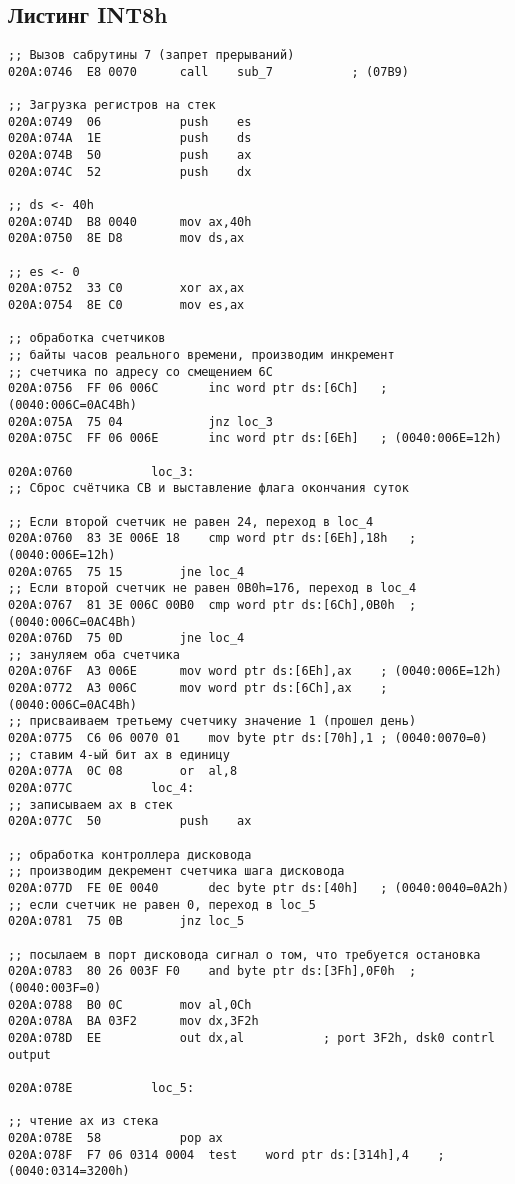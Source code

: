 \subsection*{Листинг INT8h} 
\begin{lstlisting}[style={asm}]
;; Вызов сабрутины 7 (запрет прерываний)
020A:0746  E8 0070		call	sub_7			; (07B9)

;; Загрузка регистров на стек
020A:0749  06			push	es
020A:074A  1E			push	ds
020A:074B  50			push	ax
020A:074C  52			push	dx

;; ds <- 40h
020A:074D  B8 0040		mov	ax,40h
020A:0750  8E D8		mov	ds,ax

;; es <- 0
020A:0752  33 C0		xor	ax,ax		
020A:0754  8E C0		mov	es,ax

;; обработка счетчиков
;; байты часов реального времени, производим инкремент 
;; счетчика по адресу со смещением 6C
020A:0756  FF 06 006C		inc	word ptr ds:[6Ch]	; (0040:006C=0AC4Bh)
020A:075A  75 04			jnz	loc_3			
020A:075C  FF 06 006E		inc	word ptr ds:[6Eh]	; (0040:006E=12h)

020A:0760			loc_3:
;; Сброс счётчика СВ и выставление флага окончания суток

;; Если второй счетчик не равен 24, переход в loc_4
020A:0760  83 3E 006E 18	cmp	word ptr ds:[6Eh],18h	; (0040:006E=12h)
020A:0765  75 15		jne	loc_4		
;; Если второй счетчик не равен 0B0h=176, переход в loc_4
020A:0767  81 3E 006C 00B0	cmp	word ptr ds:[6Ch],0B0h	; (0040:006C=0AC4Bh)
020A:076D  75 0D		jne	loc_4		
;; зануляем оба счетчика
020A:076F  A3 006E		mov	word ptr ds:[6Eh],ax	; (0040:006E=12h)
020A:0772  A3 006C		mov	word ptr ds:[6Ch],ax	; (0040:006C=0AC4Bh)
;; присваиваем третьему счетчику значение 1 (прошел день)
020A:0775  C6 06 0070 01	mov	byte ptr ds:[70h],1	; (0040:0070=0)
;; ставим 4-ый бит ax в единицу
020A:077A  0C 08		or	al,8
020A:077C			loc_4:
;; записываем ax в стек
020A:077C  50			push	ax

;; обработка контроллера дисковода
;; производим декремент счетчика шага дисковода
020A:077D  FE 0E 0040		dec	byte ptr ds:[40h]	; (0040:0040=0A2h)
;; если счетчик не равен 0, переход в loc_5
020A:0781  75 0B		jnz	loc_5		

;; посылаем в порт дисковода сигнал о том, что требуется остановка
020A:0783  80 26 003F F0	and	byte ptr ds:[3Fh],0F0h	; (0040:003F=0)
020A:0788  B0 0C		mov	al,0Ch
020A:078A  BA 03F2		mov	dx,3F2h
020A:078D  EE			out	dx,al			; port 3F2h, dsk0 contrl output

020A:078E			loc_5:

;; чтение ax из стека
020A:078E  58			pop	ax
020A:078F  F7 06 0314 0004	test	word ptr ds:[314h],4	; (0040:0314=3200h)


\end{lstlisting}
